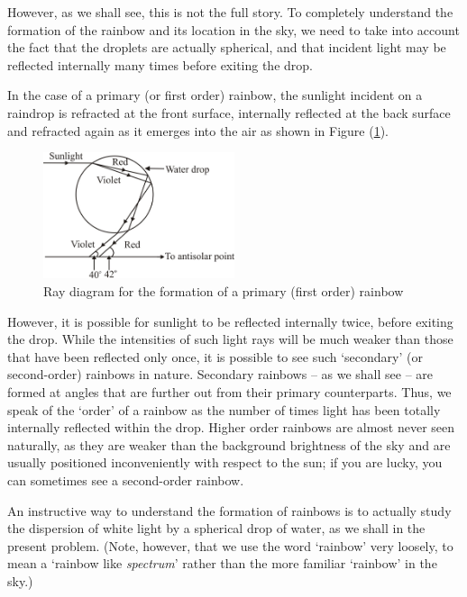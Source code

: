 However, as we shall see, this is not the full story. To completely understand the formation of the rainbow and its location in the sky, we need to take into account the fact that the droplets are actually spherical, and that incident light may be reflected internally many times before exiting the drop.

In the case of a primary (or first order) rainbow, the sunlight incident on a raindrop is refracted at the front surface, internally reflected at the back surface and refracted again as it emerges into the air as shown in Figure (\ref{fig:firstorder}). 

\begin{figure}[!htb]
    \centering
    \includegraphics[width=0.5\textwidth]{figs/img1.jpg}
    \caption{Ray diagram for the formation of a primary (first order) rainbow}
    \label{fig:firstorder}
\end{figure}


However, it is possible for sunlight to be reflected internally twice, before exiting the drop. While the intensities of such light rays will be much weaker than those that have been reflected only once, it is possible to see such `secondary' (or second-order) rainbows in nature. Secondary rainbows -- as we shall see -- are formed at angles that are further out from their primary counterparts. Thus, we speak of the `order' of a rainbow as the number of times light has been totally internally reflected within the drop. Higher order rainbows are almost never seen naturally, as they are weaker than the background brightness of the sky and are usually positioned inconveniently with respect to the sun; if you are lucky, you can sometimes see a second-order rainbow. 

An instructive way to understand the formation of rainbows is to actually study the dispersion of white light by a spherical drop of water, as we shall in the present problem. (Note, however, that we use the word `rainbow' very loosely, to mean a `rainbow like \textit{spectrum}' rather than the more familiar `rainbow' in the sky.) 



